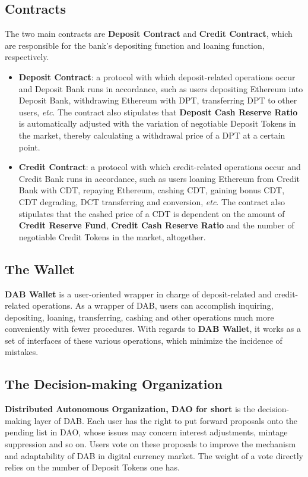 \documentclass[review]{elsarticle}
\begin{document}
\subsection{Contracts}
The two main contracts are \textbf{Deposit Contract} and \textbf{Credit Contract}, which are responsible for the bank's depositing function and loaning function, respectively.

\begin{itemize} 
   \item \textbf{Deposit Contract}: a protocol with which deposit-related operations occur and Deposit Bank runs in accordance, such as users depositing Ethereum into Deposit Bank, withdrawing Ethereum with DPT, transferring DPT to other users, \emph{etc}. The contract also stipulates that \textbf{Deposit Cash Reserve Ratio} is automatically adjusted with the variation of negotiable Deposit Tokens in the market, thereby calculating a withdrawal price of a DPT at a certain point.
   \item \textbf{Credit Contract}: a protocol with which credit-related operations occur and Credit Bank runs in accordance, such as users loaning Ethereum from Credit Bank with CDT, repaying Ethereum, cashing CDT, gaining bonus CDT, CDT degrading, DCT transferring and conversion, \emph{etc}. The contract also stipulates that the cashed price of a CDT is dependent on the amount of \textbf{Credit Reserve Fund}, \textbf{Credit Cash Reserve Ratio} and the number of negotiable Credit Tokens in the market, altogether.
\end{itemize}

\subsection{The Wallet}
\textbf{DAB Wallet} is a user-oriented wrapper in charge of deposit-related and credit-related operations. As a wrapper of DAB, users can accomplish inquiring, depositing, loaning, transferring, cashing and other operations much more conveniently with fewer procedures. With regards to \textbf{DAB Wallet}, it works as a set of interfaces of these various operations, which minimize the incidence of mistakes.

\subsection{The Decision-making Organization}
\textbf{Distributed Autonomous Organization, DAO for short} is the decision-making layer of DAB. Each user has the right to put forward proposals onto the pending list in DAO, whose issues may concern interest adjustments, mintage suppression and so on. Users vote on these proposals to improve the mechanism and adaptability of DAB in digital currency market. The weight of a vote directly relies on the number of Deposit Tokens one has.
\end{document}

